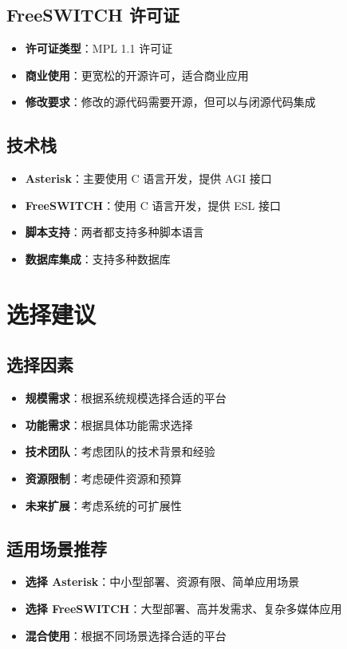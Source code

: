 \documentclass[12pt,UTF8]{ctexbook}
\begin{document}
\section{FreeSWITCH 许可证}

\begin{itemize}
  \item \textbf{许可证类型}：MPL 1.1 许可证
  \item \textbf{商业使用}：更宽松的开源许可，适合商业应用
  \item \textbf{修改要求}：修改的源代码需要开源，但可以与闭源代码集成
\end{itemize}

\section{技术栈}

\begin{itemize}
  \item \textbf{Asterisk}：主要使用 C 语言开发，提供 AGI 接口
  \item \textbf{FreeSWITCH}：使用 C 语言开发，提供 ESL 接口
  \item \textbf{脚本支持}：两者都支持多种脚本语言
  \item \textbf{数据库集成}：支持多种数据库
\end{itemize}

\chapter{选择建议}
\section{选择因素}

\begin{itemize}
  \item \textbf{规模需求}：根据系统规模选择合适的平台
  \item \textbf{功能需求}：根据具体功能需求选择
  \item \textbf{技术团队}：考虑团队的技术背景和经验
  \item \textbf{资源限制}：考虑硬件资源和预算
  \item \textbf{未来扩展}：考虑系统的可扩展性
\end{itemize}

\section{适用场景推荐}

\begin{itemize}
  \item \textbf{选择 Asterisk}：中小型部署、资源有限、简单应用场景
  \item \textbf{选择 FreeSWITCH}：大型部署、高并发需求、复杂多媒体应用
  \item \textbf{混合使用}：根据不同场景选择合适的平台
\end{itemize}

\backmatter
\end{document}
